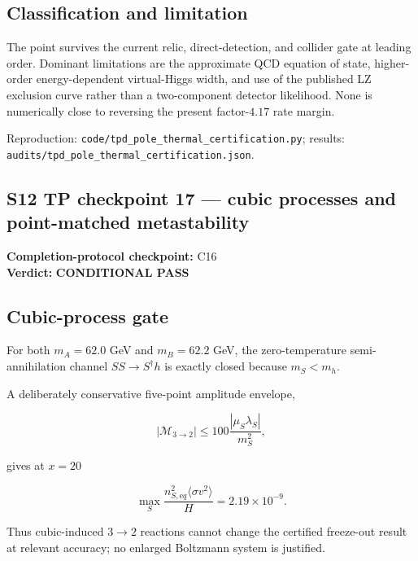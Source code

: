 \documentclass[
]{article}
\begin{document}
\hypertarget{classification-and-limitation}{%
\subsection{Classification and
limitation}\label{classification-and-limitation}}

The point survives the current relic, direct-detection, and collider
gate at leading order. Dominant limitations are the approximate QCD
equation of state, higher-order energy-dependent virtual-Higgs width,
and use of the published LZ exclusion curve rather than a two-component
detector likelihood. None is numerically close to reversing the present
factor-\(4.17\) rate margin.

Reproduction: \texttt{code/tpd\_pole\_thermal\_certification.py};
results: \texttt{audits/tpd\_pole\_thermal\_certification.json}.

\newpage

\hypertarget{s12-tp-checkpoint-17-cubic-processes-and-point-matched-metastability}{%
\subsection{S12 TP checkpoint 17 --- cubic processes and point-matched
metastability}\label{s12-tp-checkpoint-17-cubic-processes-and-point-matched-metastability}}

\textbf{Completion-protocol checkpoint:} C16\\
\textbf{Verdict:} \textbf{CONDITIONAL PASS}

\hypertarget{cubic-process-gate}{%
\subsection{Cubic-process gate}\label{cubic-process-gate}}

For both \(m_A=62.0\) GeV and \(m_B=62.2\) GeV, the zero-temperature
semi-annihilation channel \(SS\to S^\dagger h\) is exactly closed
because \(m_S<m_h\).

A deliberately conservative five-point amplitude envelope,

\[
|\mathcal M_{3\to2}|\le 100\frac{|\mu_S\lambda_S|}{m_S^2},
\]

gives at \(x=20\)

\[
\max_S\frac{n_{S,\mathrm eq}^2\langle\sigma v^2\rangle}{H}
=2.19\times10^{-9}.
\]

Thus cubic-induced \(3\to2\) reactions cannot change the certified
freeze-out result at relevant accuracy; no enlarged Boltzmann system is
justified.
\end{document}
